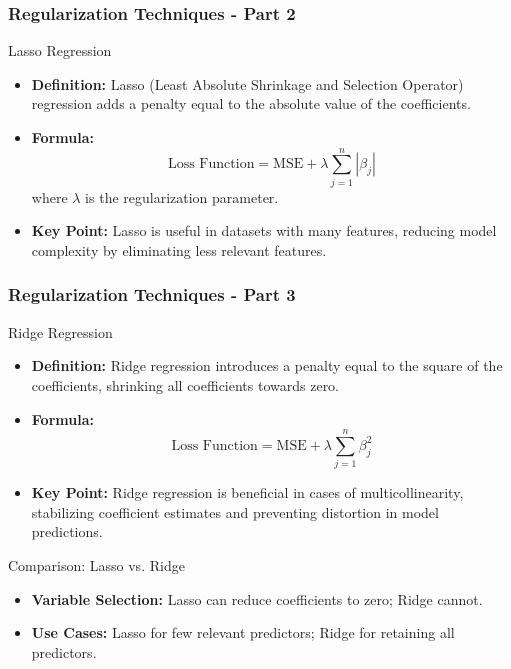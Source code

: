 \documentclass[aspectratio=169]{beamer}
\begin{document}
\begin{frame}[fragile]
    \frametitle{Regularization Techniques - Part 2}
    \begin{block}{Lasso Regression}
        \begin{itemize}
            \item \textbf{Definition:} Lasso (Least Absolute Shrinkage and Selection Operator) regression adds a penalty equal to the absolute value of the coefficients.
            \item \textbf{Formula:}
            \begin{equation}
                \text{Loss Function} = \text{MSE} + \lambda \sum_{j=1}^{n} |\beta_j|
            \end{equation}
            where \( \lambda \) is the regularization parameter.
            \item \textbf{Key Point:} Lasso is useful in datasets with many features, reducing model complexity by eliminating less relevant features.
        \end{itemize}
    \end{block}
\end{frame}

\begin{frame}[fragile]
    \frametitle{Regularization Techniques - Part 3}
    \begin{block}{Ridge Regression}
        \begin{itemize}
            \item \textbf{Definition:} Ridge regression introduces a penalty equal to the square of the coefficients, shrinking all coefficients towards zero.
            \item \textbf{Formula:}
            \begin{equation}
                \text{Loss Function} = \text{MSE} + \lambda \sum_{j=1}^{n} \beta_j^2
            \end{equation}
            \item \textbf{Key Point:} Ridge regression is beneficial in cases of multicollinearity, stabilizing coefficient estimates and preventing distortion in model predictions.
        \end{itemize}

        \begin{block}{Comparison: Lasso vs. Ridge}
            \begin{itemize}
                \item \textbf{Variable Selection:} Lasso can reduce coefficients to zero; Ridge cannot.
                \item \textbf{Use Cases:} Lasso for few relevant predictors; Ridge for retaining all predictors.
            \end{itemize}
        \end{block}
    \end{block}
\end{frame}
\end{document}
